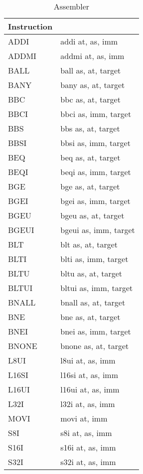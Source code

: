 \begin{smalltables}
	\begin{longtable}{|p{5cm}|p{5cm}|}
		\caption{Assembler\label{long}}\\
		\hline
		Instruction & \\
		\hline
		ADDI & addi at, as, imm\\ \hline
		ADDMI & addmi at, as, imm\\ \hline
		BALL & ball as, at, target\\ \hline
		BANY & bany as, at, target\\ \hline
		BBC & bbc as, at, target\\ \hline
		BBCI & bbci as, imm, target\\ \hline
		BBS & bbs as, at, target\\ \hline
		BBSI & bbsi as, imm, target\\ \hline
		BEQ & beq as, at, target\\ \hline
		BEQI & beqi as, imm, target\\ \hline
		BGE & bge as, at, target\\ \hline
		BGEI & bgei as, imm, target\\ \hline
		BGEU & bgeu as, at, target\\ \hline
		BGEUI & bgeui as, imm, target\\ \hline
		BLT & blt as, at, target\\ \hline
		BLTI & blti as, imm, target\\ \hline
		BLTU & bltu as, at, target\\ \hline
		BLTUI & bltui as, imm, target\\ \hline
		BNALL & bnall as, at, target\\ \hline
		BNE & bne as, at, target\\ \hline
		BNEI & bnei as, imm, target\\ \hline
		BNONE & bnone as, at, target\\ \hline
		L8UI & l8ui at, as, imm\\ \hline
		L16SI & l16si at, as, imm\\ \hline
		L16UI & l16ui at, as, imm\\ \hline
		L32I & l32i at, as, imm\\ \hline
		MOVI & movi at, imm\\ \hline
		S8I & s8i at, as, imm\\ \hline
		S16I & s16i at, as, imm\\ \hline
		S32I & s32i at, as, imm\\ \hline
	\end{longtable}
\end{smalltables}